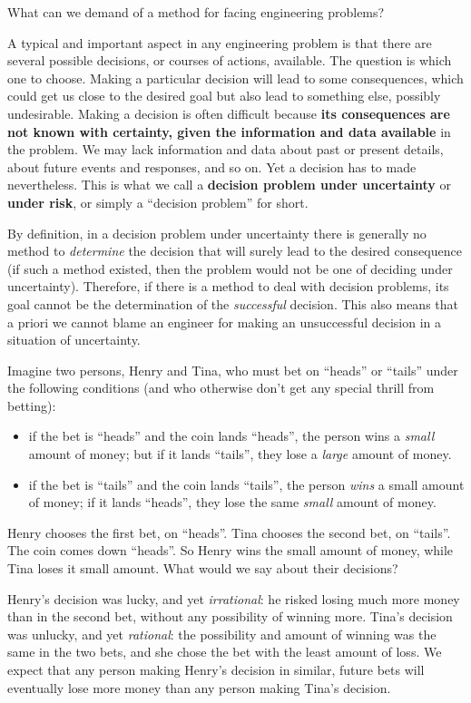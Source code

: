 \documentclass[
  a4paper,
  DIV=11,
  numbers=noendperiod,
  oneside]{scrreprt}
\providecommand{\tightlist}{%
  \setlength{\itemsep}{0pt}\setlength{\parskip}{0pt}}\usepackage{longtable,booktabs,array}
\begin{document}
What can we demand of a method for facing engineering problems?

A typical and important aspect in any engineering problem is that there
are several possible decisions, or courses of actions, available. The
question is which one to choose. Making a particular decision will lead
to some consequences, which could get us close to the desired goal but
also lead to something else, possibly undesirable. Making a decision is
often difficult because \textbf{its consequences are not known with
certainty, given the information and data available} in the problem. We
may lack information and data about past or present details, about
future events and responses, and so on. Yet a decision has to made
nevertheless. This is what we call a {\textbf{decision problem under
uncertainty}} or {\textbf{under risk}}, or simply a ``decision problem''
for short.

By definition, in a decision problem under uncertainty there is
generally no method to \emph{determine} the decision that will surely
lead to the desired consequence (if such a method existed, then the
problem would not be one of deciding under uncertainty). Therefore, if
there is a method to deal with decision problems, its goal cannot be the
determination of the \emph{successful} decision. This also means that a
priori we cannot blame an engineer for making an unsuccessful decision
in a situation of uncertainty.

Imagine two persons, Henry and Tina, who must bet on ``heads'' or
``tails'' under the following conditions (and who otherwise don't get
any special thrill from betting):

\begin{itemize}
\tightlist
\item
  if the bet is ``heads'' and the coin lands ``heads'', the person wins
  a \emph{small} amount of money; but if it lands ``tails'', they lose a
  \emph{large} amount of money.
\item
  if the bet is ``tails'' and the coin lands ``tails'', the person
  \emph{wins} a small amount of money; if it lands ``heads'', they lose
  the same \emph{small} amount of money.
\end{itemize}

Henry chooses the first bet, on ``heads''. Tina chooses the second bet,
on ``tails''. The coin comes down ``heads''. So Henry wins the small
amount of money, while Tina loses it small amount. What would we say
about their decisions?

Henry's decision was lucky, and yet \emph{irrational}: he risked losing
much more money than in the second bet, without any possibility of
winning more. Tina's decision was unlucky, and yet \emph{rational}: the
possibility and amount of winning was the same in the two bets, and she
chose the bet with the least amount of loss. We expect that any person
making Henry's decision in similar, future bets will eventually lose
more money than any person making Tina's decision.
\end{document}
